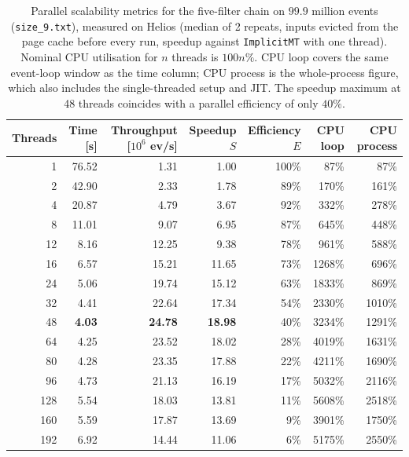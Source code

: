 \begin{table}[htbp]
\centering
\caption{Parallel scalability metrics for the five-filter chain on $99.9$ million events (\texttt{size\_9.txt}), measured on Helios (median of 2 repeats, inputs evicted from the page cache before every run, speedup against \texttt{ImplicitMT} with one thread). Nominal CPU utilisation for $n$ threads is $100n\%$. CPU loop covers the same event-loop window as the time column; CPU process is the whole-process figure, which also includes the single-threaded setup and JIT. The speedup maximum at 48 threads coincides with a parallel efficiency of only $40\%$.}
\label{tab:scalability-chain}
\begin{tabular}{rrrrrrr}
\toprule
Threads & Time [s] & Throughput [$10^6$ ev/s] & Speedup $S$ & Efficiency $E$ & CPU loop & CPU process \\
\midrule
 1 & 76.52 & 1.31 & 1.00 & 100\% & 87\% & 87\% \\
 2 & 42.90 & 2.33 & 1.78 & 89\% & 170\% & 161\% \\
 4 & 20.87 & 4.79 & 3.67 & 92\% & 332\% & 278\% \\
 8 & 11.01 & 9.07 & 6.95 & 87\% & 645\% & 448\% \\
12 & 8.16 & 12.25 & 9.38 & 78\% & 961\% & 588\% \\
16 & 6.57 & 15.21 & 11.65 & 73\% & 1268\% & 696\% \\
24 & 5.06 & 19.74 & 15.12 & 63\% & 1833\% & 869\% \\
32 & 4.41 & 22.64 & 17.34 & 54\% & 2330\% & 1010\% \\
48 & \textbf{4.03} & \textbf{24.78} & \textbf{18.98} & 40\% & 3234\% & 1291\% \\
64 & 4.25 & 23.52 & 18.02 & 28\% & 4019\% & 1631\% \\
80 & 4.28 & 23.35 & 17.88 & 22\% & 4211\% & 1690\% \\
96 & 4.73 & 21.13 & 16.19 & 17\% & 5032\% & 2116\% \\
128 & 5.54 & 18.03 & 13.81 & 11\% & 5608\% & 2518\% \\
160 & 5.59 & 17.87 & 13.69 & 9\% & 3901\% & 1750\% \\
192 & 6.92 & 14.44 & 11.06 & 6\% & 5175\% & 2550\% \\
\bottomrule
\end{tabular}
\end{table}
